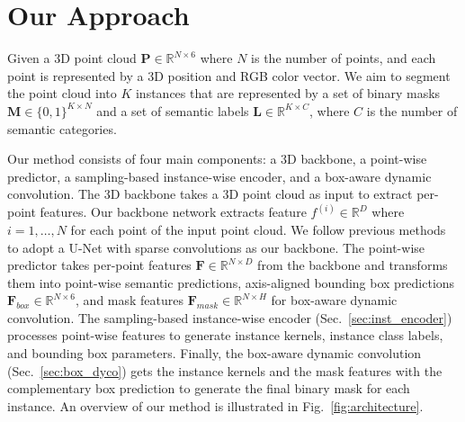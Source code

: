 \documentclass[10pt,twocolumn,letterpaper]{article}
\begin{document}
\section{Our Approach}

\label{sec:approach}

Given a 3D point cloud $\mathbf{P} \in \mathbb{R}^{N\times6}$ where $N$ is the number of points, and each point is represented by a 3D position and RGB color vector.
We aim to segment the point cloud into $K$ instances that are represented by a set of binary masks $\mathbf{M} \in \{0,1\}^{K \times N}$ and a set of semantic labels $\mathbf{L} \in \mathbb{R} ^{K \times C}$, where $C$ is the number of semantic categories. 

Our method consists of four main components: a 3D backbone, a point-wise predictor, a sampling-based instance-wise encoder, and a box-aware dynamic convolution. 
The 3D backbone takes a 3D point cloud as input to extract per-point features. 
Our backbone network extracts feature $f^{(i)} \in \mathbb{R}^{D}$ where $i=1,\ldots, N$ for each point of the input point cloud.
We follow previous methods \cite{chen2021hierarchical,vu2022softgroup,wu2022dknet} to adopt a U-Net with sparse convolutions \cite{graham20183d} as our backbone. 
The point-wise predictor takes per-point features $\mathbf{F} \in \mathbb{R}^{N \times D}$ from the backbone and transforms them into point-wise semantic predictions, axis-aligned bounding box predictions $\mathbf{F}_{box} \in \mathbb{R}^{N \times 6}$, and mask features $\mathbf{F}_{mask} \in \mathbb{R}^{N \times H}$ for box-aware dynamic convolution.
The sampling-based instance-wise encoder (Sec.~\ref{sec:inst_encoder}) processes point-wise features to generate instance kernels, instance class labels, and bounding box parameters. 
Finally, the box-aware dynamic convolution (Sec.~\ref{sec:box_dyco}) gets the instance kernels and the mask features with the complementary box prediction to generate the final binary mask for each instance.
An overview of our method is illustrated in Fig.~\ref{fig:architecture}.
\end{document}
